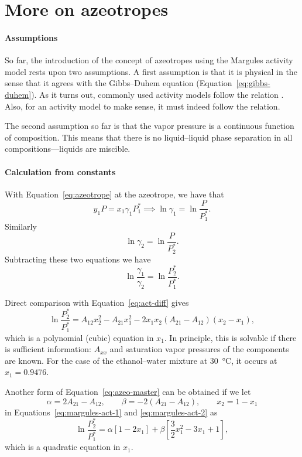 \section{More on azeotropes}

\paragraph{Assumptions}
So far, the introduction of the concept of azeotropes using the Margules
activity model rests upon two assumptions. A first assumption is that it
is physical in the sense that it agrees with the Gibbs--Duhem equation
(Equation~\ref{eq:gibbs-duhem}). As it turns out, commonly used activity 
models follow the relation \cite[p.~440]{enggbook}. Also, for an
activity model to make sense, it must indeed follow the relation.

The second assumption so far is that the vapor pressure is a continuous function
of composition. This means that there is no liquid--liquid phase separation
in all compositions---liquids are miscible.

\paragraph{Calculation from constants}
With Equation~\ref{eq:azeotrope} at the azeotrope, we have that
\[
    y_1P = x_1\gamma_1P_1^* \implies \ln\gamma_1 = \ln \dfrac{P}{P_1^*}.
\]
Similarly
\[
    \ln\gamma_2 = \ln \dfrac{P}{P_2^*}.
\]
Subtracting these two equations we have
\begin{equation}\label{eq:act-diff2}
    \ln \dfrac{\gamma_1}{\gamma_2} = \ln \dfrac{P_2^*}{P_1^*}.
\end{equation}

Direct comparison with Equation~\ref{eq:act-diff} gives
\begin{equation}\label{eq:azeo-master}
    \ln \dfrac{P_2^*}{P_1^*} = A_{12}x_2^2 - A_{21}x_1^2 - 2x_1x_2
    (A_{21} - A_{12})(x_2 - x_1),
\end{equation}
which is a polynomial (cubic) equation in $x_1$. In principle, this is
solvable if there is sufficient information: $A_{xx}$ and
saturation vapor pressures of the components are known. For the case of
the ethanol--water mixture at \SI{30}{\celsius}, it occurs at $x_1 = 0.9476$.

Another form of Equation~\ref{eq:azeo-master} can be obtained if we let
\[
    \alpha = 2A_{21} - A_{12},\qquad \beta = -2(A_{21} - A_{12}),\qquad
    x_2 = 1 - x_1
\]
in Equations~\ref{eq:margules-act-1} and \ref{eq:margules-act-2} as
\begin{equation}\label{eq:azeo-master2}
    \ln \dfrac{P_2^*}{P_1^*} = \alpha[1 - 2x_1] + \beta[\frac32 x_1^2 - 
    3x_1 + 1],
\end{equation}
which is a quadratic equation in $x_1$.
